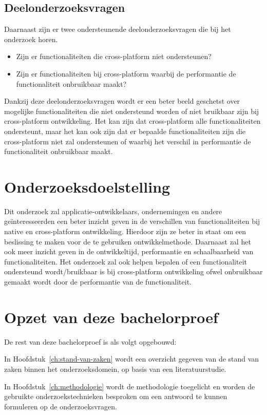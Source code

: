 \newpage
\subsection{Deelonderzoeksvragen}
Daarnaast zijn er twee ondersteunende deelonderzoeksvragen die bij het onderzoek horen.
\begin{itemize}
    \item Zijn er functionaliteiten die cross-platform niet ondersteunen?
    \item Zijn er functionaliteiten bij cross-platform waarbij de performantie de functionaliteit onbruikbaar maakt?
\end{itemize}
Dankzij deze deelonderzoeksvragen wordt er een beter beeld geschetst over mogelijke functionaliteiten die niet 
ondersteund worden of niet bruikbaar zijn bij cross-platform ontwikkeling. Het kan zijn dat cross-platform alle functionaliteiten ondersteunt,
maar het kan ook zijn dat er bepaalde functionaliteiten zijn die cross-platform niet zal ondersteunen of waarbij het verschil 
in performantie de functionaliteit onbruikbaar maakt.


\section{Onderzoeksdoelstelling}%
\label{sec:onderzoeksdoelstelling}
Dit onderzoek zal applicatie-ontwikkelaars, ondernemingen en andere geïnteresseerden een beter inzicht geven in de verschillen van functionaliteiten 
bij native en cross-platform ontwikkeling. Hierdoor zijn ze beter in staat om een beslissing te maken voor de te gebruiken ontwikkelmethode. 
Daarnaast zal het ook meer inzicht geven in de ontwikkeltijd, performantie en schaalbaarheid van functionaliteiten. 
Het onderzoek zal ook helpen bepalen of een functionaliteit ondersteund wordt/bruikbaar is bij cross-platform ontwikkeling ofwel 
onbruikbaar gemaakt wordt door de performantie van de functionaliteit.
 

\section{Opzet van deze bachelorproef}%
\label{sec:opzet-bachelorproef}
De rest van deze bachelorproef is als volgt opgebouwd:

In Hoofdstuk~\ref{ch:stand-van-zaken} wordt een overzicht gegeven van de stand van zaken binnen 
het onderzoeksdomein, op basis van een literatuurstudie.

In Hoofdstuk~\ref{ch:methodologie} wordt de methodologie toegelicht en worden de gebruikte onderzoekstechnieken 
besproken om een antwoord te kunnen formuleren op de onderzoeksvragen.

